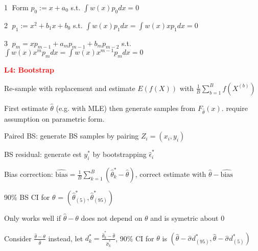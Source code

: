 \documentclass{article}
\renewcommand{\section}[1]{\textcolor{red}{\textbf{#1}}}
\renewcommand{\subsection}[1]{\text{\hl{[#1]}}}
\newcommand{\circled}[1]{\textcircled{\footnotesize #1}}
\begin{document}
\circled{1} Form $p_0 := x + a_0$ s.t. $\int w(x) p_0 dx = 0$

\circled{2} $p_1 := x^2 + b_1 x + b_0$ s.t. $\int w(x) p_1 dx = \int w(x) x p_1 dx = 0$

\circled{3} $p_m = x p_{m-1} + a_m p_{m-1} + b_m p_{m-2}$ s.t. $\int w(x) x^m p_m dx = \int w(x) x^{m-1}p_m dx = 0$


\section{L4: Bootstrap}

\subsection{Nonparametric}
Re-sample with replacement and estimate $E(f(X))$ with $\frac{1}{B}\sum_{b=1}^B f(X^{(b)})$

\subsection{Parametric}
First estimate $\hat\theta$ (e.g. with MLE) then generate samples from $F_{\hat\theta}(x)$. require assumption on parametric form.

\subsection{BS techniques}
Paired BS: generate BS samples by pairing $Z_i = (x_i, y_i)$

BS residual: generate est $y_i^*$ by bootstrapping $\hat\epsilon_i^*$

Bias correction: $\hat{\text{bias}} = \frac{1}{B}\sum_{k=1}^B (\hat\theta_k^* - \hat\theta)$, correct estimate with $\hat\theta - \hat{\text{bias}}$

\subsection{BS Percentile CI}
90\% BS CI for $\theta$ = $\left(\hat\theta^*_{(5)}, \hat\theta^*_{(95)}\right)$

Only works well if $\hat\theta - \theta$ does not depend on $\theta$ and is symetric about 0

\subsection{BS t CI}
Consider $\frac{\hat\theta - \theta}{\hat\theta}$ instead, let $d^*_k = \frac{\hat\theta_k^* - \hat\theta}{\hat\sigma^*_k}$,
90\% CI for $\theta$ is $(\hat\theta - \hat\sigma d^*_{(95)}, \hat\theta - \hat\sigma d^*_{(5)})$
\end{document}
